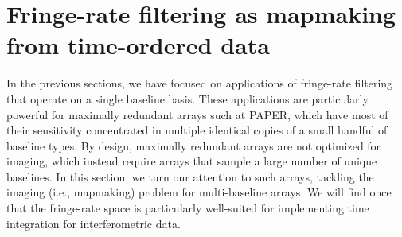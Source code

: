 \documentclass[twocolumn,apj,numberedappendix]{emulateapj}
\begin{document}







\section{Fringe-rate filtering as mapmaking from time-ordered data}
\label{sec:Mapmaking}

In the previous sections, we have focused on applications of fringe-rate filtering that operate on a single baseline basis. These applications are particularly powerful for maximally redundant arrays such at PAPER, which have most of their sensitivity concentrated in multiple identical copies of a small handful of baseline types. By design, maximally redundant arrays are not optimized for imaging, which instead require arrays that sample a large number of unique baselines. In this section, we turn our attention to such arrays, tackling the imaging (i.e., mapmaking) problem for multi-baseline arrays. We will find once that the fringe-rate space is particularly well-suited for implementing time integration for interferometric data.

\end{document}
